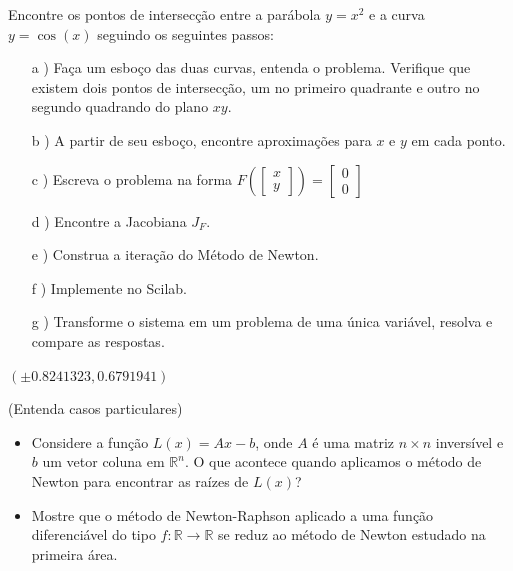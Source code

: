 \begin{exer} Encontre os pontos de intersecção entre a parábola $y=x^2$ e a curva $y=\cos(x)$ seguindo os seguintes passos:
\begin{itemize}
\item[a]) Faça um esboço das duas curvas, entenda o problema. Verifique que existem dois pontos de intersecção, um no primeiro quadrante e outro no segundo quadrando do plano $xy$.
\item[b]) A partir de seu esboço, encontre aproximações para $x$ e $y$ em cada ponto.
\item[c]) Escreva o problema na forma $F\left(\left[\begin{array}{c}x\\y\end{array}\right]\right)=\left[\begin{array}{c}0\\0\end{array}\right]$
\item[d]) Encontre a Jacobiana $J_F$.
\item[e]) Construa a iteração do Método de Newton.
\item[f]) Implemente no Scilab.
\item[g]) Transforme o sistema em um problema de uma única variável, resolva e compare as respostas.
\end{itemize}

\end{exer}

\begin{resp}
 $\left(\pm 0.8241323, 0.6791941\right)$
\end{resp}


\begin{exer}(Entenda casos particulares)
\begin{itemize}
\item Considere a função $L(x)=Ax-b$, onde $A$ é uma matriz $n\times n$ inversível e $b$ um vetor coluna em $\mathbb{R}^n$. O que acontece quando aplicamos o método de Newton para encontrar as raízes de $L(x)$?
\item Mostre que o método de Newton-Raphson aplicado a uma função diferenciável do tipo $f:\mathbb{R}\to\mathbb{R}$ se reduz ao método de Newton estudado na primeira área.
\end{itemize}

\end{exer}



